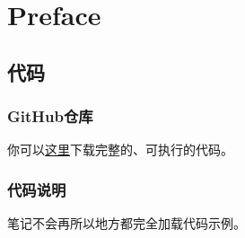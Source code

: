 \chapter*{Preface\label{Preface}}
\section{代码}
\subsection{GitHub仓库}
你可以\href{https://github.com/JPL-JUNO/Python-for-Finance-CookBook-P4FC}{这里}下载完整的、可执行的代码。
\subsection{代码说明}
笔记不会再所以地方都完全加载代码示例。
